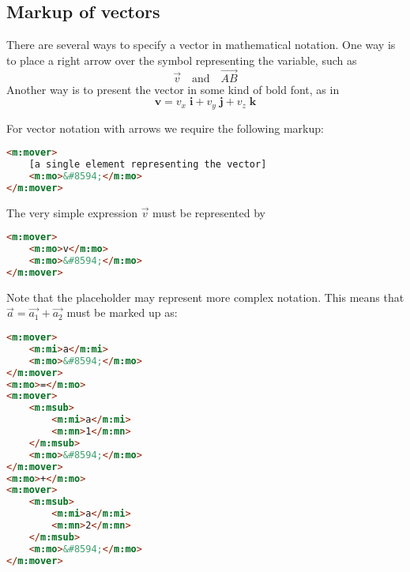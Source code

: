 \documentclass[english,a4paper,11pt]{article}
\begin{document}
\subsection{Markup of vectors}
There are several ways to specify a vector in mathematical notation. One way is to place a right arrow over the symbol representing the variable, such as 
\begin{equation}
\vec{v}\quad \text{and}\quad \overrightarrow{AB}
\end{equation}
Another way is to present the vector in some kind of bold font, as in 
\begin{equation}
\mathbf{v} = v_x\;  \mathbf{i} + v_y\; \mathbf{j} + v_z\;  \mathbf{k}
\end{equation}

\bigskip
For vector notation with arrows we require the following markup:
\begin{lstlisting}[language=HTML]
<m:mover>
	[a single element representing the vector]
	<m:mo>&#8594;</m:mo>
</m:mover>
\end{lstlisting}

\begin{examples}
The very simple expression $\vec{v}$ must be represented by
\begin{lstlisting}[language=HTML]
<m:mover>
	<m:mo>v</m:mo>
	<m:mo>&#8594;</m:mo>
</m:mover>
\end{lstlisting}
Note that the placeholder  may represent more complex notation. This means that $\vec{a} = \vec{a_1} + \vec{a_2}$ must be marked up as:
\begin{lstlisting}[language=HTML]
<m:mover>
	<m:mi>a</m:mi>
	<m:mo>&#8594;</m:mo>
</m:mover>
<m:mo>=</m:mo>
<m:mover>
	<m:msub>
		<m:mi>a</m:mi>
		<m:mn>1</m:mn>
	</m:msub>
	<m:mo>&#8594;</m:mo>
</m:mover>
<m:mo>+</m:mo>
<m:mover>
	<m:msub>
		<m:mi>a</m:mi>
		<m:mn>2</m:mn>
	</m:msub>
	<m:mo>&#8594;</m:mo>
</m:mover>
\end{lstlisting}
\end{examples}
\end{document}
